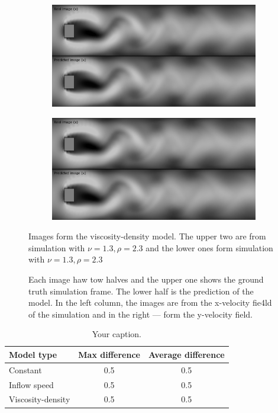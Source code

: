 \documentclass{llncs}
\begin{document}
\begin{figure}
  \begin{subfigure}{.5\textwidth}
    \centering
    \includegraphics[width=1\linewidth]{imgs/single_fluid_x_2}  
  \end{subfigure}
  \begin{subfigure}{.5\textwidth}
    \centering
    \includegraphics[width=1\linewidth]{imgs/single_fluid_y_2}
  \end{subfigure}

  \begin{center}
  Images form the viscosity-density model. The upper two are from simulation with $\nu=1.3, \rho=2.3$ and the lower ones form simulation with $\nu=1.3, \rho=2.3$
  \end{center}

  \caption{Each image haw tow halves and the upper one shows the ground truth simulation frame. The lower half is the prediction of the model. In the left column, the images are from the x-velocity fie4ld of the simulation and in the right --- form the y-velocity field.}
\end{figure}

\begin{table}
  \begin{center}
    \begin{tabular}{l|c|c}
      Model type & Max difference &  Average difference\\
      \hline
      Constant & 0.5 &  0.5 \\
      Inflow speed &  0.5 &  0.5 \\
      Viscosity-density &  0.5  &  0.5 \\
    \end{tabular}
  \end{center}
  \caption{\label{tab:table-name} Your caption.}
\end{table}
\end{document}
